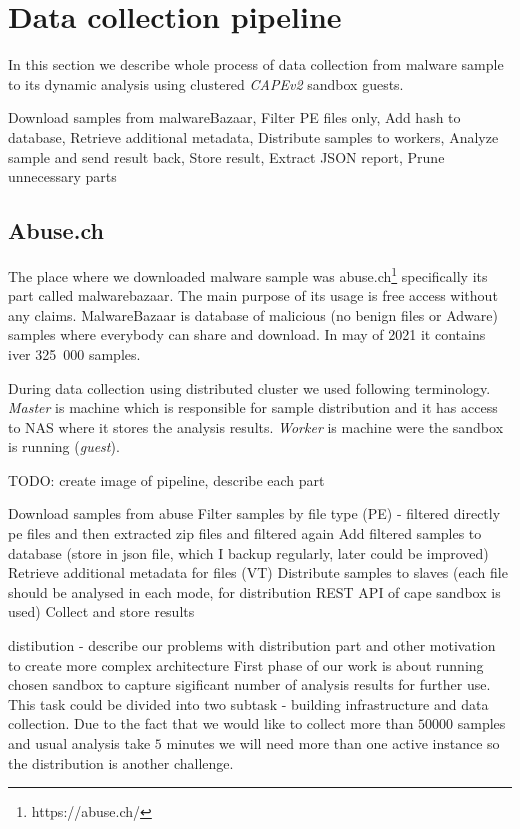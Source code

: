 \section{Data collection pipeline}
In this section we describe whole process of data collection from malware sample to its dynamic analysis using clustered \emph{CAPEv2} sandbox guests.

Download samples from malwareBazaar,
Filter PE files only,
Add hash to database,
Retrieve additional metadata,
Distribute samples to workers,
Analyze sample and send result back,
Store result,
Extract JSON report,
Prune unnecessary parts





\subsection{Abuse.ch}
The place where we downloaded malware sample was abuse.ch\footnote{https://abuse.ch/} specifically its part called malwarebazaar. The main purpose of its usage is free access without any claims. MalwareBazaar is database of malicious (no benign files or Adware) samples where everybody can share and download. In may of 2021 it contains iver 325~000 samples.


During data collection using distributed cluster we used following terminology. \emph{Master} is machine which is responsible for sample distribution and it has access to NAS where it stores the analysis results. \emph{Worker} is machine were the sandbox is running (\emph{guest}).


TODO: create image of pipeline, describe each part

Download samples from abuse
Filter samples by file type (PE) - filtered directly pe files and then extracted zip files and filtered again
Add filtered samples to database (store in json file, which I backup regularly, later could be improved)
Retrieve additional metadata for files (VT)
Distribute samples to slaves (each file should be analysed in each mode, for distribution REST API of cape sandbox is used)
Collect and store results

distibution - describe our problems with distribution part and other motivation to create more complex architecture
First phase of our work is about running chosen sandbox to capture sigificant number of analysis results for further use. This task could be divided into two subtask - building infrastructure and data collection. Due to the fact that we would like to collect more than $50 000$ samples and usual analysis take $5$ minutes we will need more than one active instance so the distribution is another challenge.


